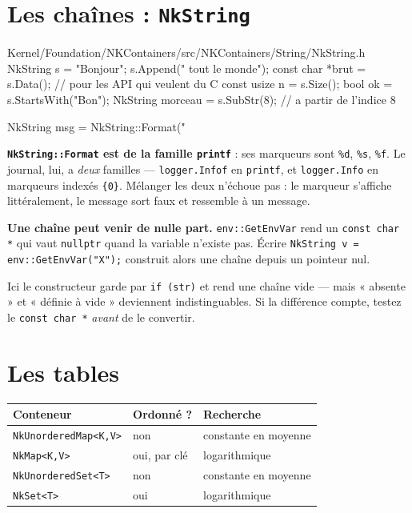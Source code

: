 \section{Les chaînes : \texttt{NkString}}

\begin{nkcode}{Kernel/Foundation/NKContainers/src/NKContainers/String/NkString.h}
NkString s = "Bonjour";
s.Append(" tout le monde");
const char *brut = s.Data();          // pour les API qui veulent du C
const usize n = s.Size();
bool ok = s.StartsWith("Bon");
NkString morceau = s.SubStr(8);       // a partir de l'indice 8

NkString msg = NkString::Format("%
\end{nkcode}

\begin{nkpiege}
\textbf{\texttt{NkString::Format} est de la famille \texttt{printf}} : ses
marqueurs sont \texttt{\%d}, \texttt{\%s}, \texttt{\%f}. Le journal, lui, a
\emph{deux} familles --- \texttt{logger.Infof} en \texttt{printf}, et
\texttt{logger.Info} en marqueurs indexés \texttt{\{0\}}. Mélanger les deux
n'échoue pas : le marqueur s'affiche littéralement, le message sort faux et
ressemble à un message.
\end{nkpiege}

\begin{nkpiege}
\textbf{Une chaîne peut venir de nulle part.} \texttt{env::GetEnvVar} rend un
\texttt{const char *} qui vaut \texttt{nullptr} quand la variable n'existe pas.
Écrire \texttt{NkString v = env::GetEnvVar("X");} construit alors une chaîne
depuis un pointeur nul.

Ici le constructeur garde par \texttt{if (str)} et rend une chaîne vide --- mais
« absente » et « définie à vide » deviennent indistinguables. Si la différence
compte, testez le \texttt{const char *} \emph{avant} de le convertir.
\end{nkpiege}

\section{Les tables}

\begin{center}
\begin{tabular}{@{}lll@{}}
\toprule
\textbf{Conteneur} & \textbf{Ordonné ?} & \textbf{Recherche} \\
\midrule
\texttt{NkUnorderedMap<K,V>} & non & constante en moyenne \\
\texttt{NkMap<K,V>} & oui, par clé & logarithmique \\
\texttt{NkUnorderedSet<T>} & non & constante en moyenne \\
\texttt{NkSet<T>} & oui & logarithmique \\
\bottomrule
\end{tabular}
\end{center}

